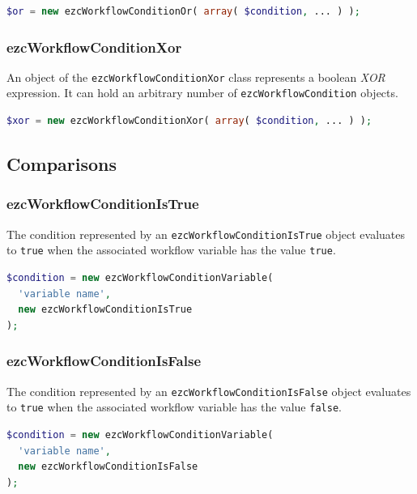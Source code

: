 \begin{lstlisting}[language=PHP]
$or = new ezcWorkflowConditionOr( array( $condition, ... ) );
\end{lstlisting}

\subsubsection{ezcWorkflowConditionXor}

An object of the \texttt{ezcWorkflowConditionXor} class represents a
boolean \emph{XOR} expression. It can hold an arbitrary number of
\texttt{ezcWorkflowCondition} objects.

\begin{lstlisting}[language=PHP]
$xor = new ezcWorkflowConditionXor( array( $condition, ... ) );
\end{lstlisting}

\subsection{Comparisons}

\subsubsection{ezcWorkflowConditionIsTrue}

The condition represented by an \texttt{ezcWorkflowConditionIsTrue} object
evaluates to \texttt{true} when the associated workflow variable has the
value \texttt{true}.

\begin{lstlisting}[language=PHP]
$condition = new ezcWorkflowConditionVariable(
  'variable name',
  new ezcWorkflowConditionIsTrue
);
\end{lstlisting}

\subsubsection{ezcWorkflowConditionIsFalse}

The condition represented by an \texttt{ezcWorkflowConditionIsFalse} object
evaluates to \texttt{true} when the associated workflow variable has the
value \texttt{false}.

\begin{lstlisting}[language=PHP]
$condition = new ezcWorkflowConditionVariable(
  'variable name',
  new ezcWorkflowConditionIsFalse
);
\end{lstlisting}

